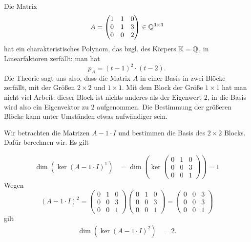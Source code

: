 \begin{bsp} 
			Die Matrix 
			\[
				 A = \begin{pmatrix}
				1 & 1 & 0 \\
				0 & 1 & 3 \\
				0 & 0 & 2
			\end{pmatrix} \in \mathbb Q^{3 \times 3} 
			\]
			hat ein charakteristisches Polynom, das bzgl. des Körpers 
			$ \mathbb K = \mathbb Q $, in Linearfaktoren zerfällt: man hat 
			\[ 
				p_A = (t-1)^2 \cdot (t-2).
			\]
			Die Theorie sagt uns also, dass die Matrix $A$ in einer Basis in zwei Blöcke zerfällt, mit der Größen $2 \times 2$ und $1 \times 1$. Mit dem Block der Größe $1 \times 1$ hat man nicht viel Arbeit: dieser Block ist nichts anderes als der Eigenwert $2$, in die Basis wird also ein Eigenvektor zu $2$ aufgenommen. Die Bestimmung der größeren Blöcke kann unter Umständen etwas aufwändiger sein. 
			
			
			 Wir betrachten die Matrizen  $ A- 1\cdot I $ und bestimmen die Basis des $2 \times 2$ Blocks. Dafür berechnen wir. Es gilt
			 
			 \begin{align*}
			  \dim( \ker(A-1\cdot I)^1 ) & = \dim \left( \ker\begin{pmatrix}
				0 & 1 & 0 \\
				0 & 0 & 3 \\
				0 & 0 & 1
			\end{pmatrix} \right) = 1
			\end{align*}
			Wegen 
						\begin{equation*}
			(A-1\cdot I)^2 = \begin{pmatrix}
			0 & 1 & 0 \\
			0 & 0 & 3 \\
			0 & 0 & 1
			\end{pmatrix} \begin{pmatrix}
			0 & 1 & 0 \\
			0 & 0 & 3 \\
			0 & 0 & 1
			\end{pmatrix} = \begin{pmatrix}
			0 & 0 & 3 \\
			0 & 0 & 3 \\
			0 & 0 & 1
			\end{pmatrix}
			\end{equation*}
			gilt 
			\begin{align*} 
				 \dim(\ker(A-1\cdot I)^2) & =  2.
			\end{align*}
			

\end{bsp}
